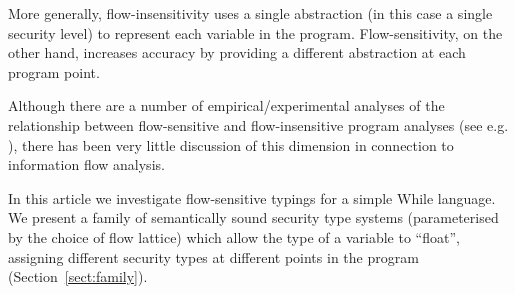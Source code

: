\documentclass{sigplanconf}
\begin{document}
More generally, flow-insensitivity uses a single abstraction (in this
case a single security level) to represent each variable in the
program. Flow-sensitivity, on the other hand, increases accuracy by
providing a different abstraction at each program point.

Although there are a number of empirical/experimental analyses of the
relationship between flow-sensitive and flow-insensitive program
analyses (see e.g. \cite{Carini:Hind:Flow}), there has been very little discussion of
this dimension in connection to information flow analysis.

In this article we investigate flow-sensitive typings
for a simple While language.
We present a
family of semantically sound security type systems (parameterised
by the choice of flow lattice) which allow the type of a
variable to ``float'', assigning different security types at
different points in the program (Section~\ref{sect:family}).
\end{document}

